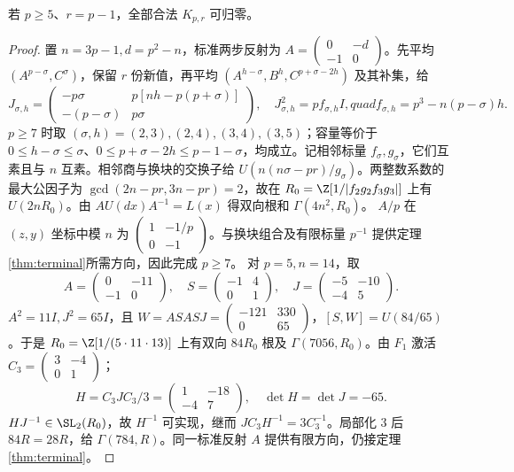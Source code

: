 \begin{lemma}\label{lem:upper-boundary}
若 $p\ge5$、$r=p-1$，全部合法 $K_{p,r}$ 可归零。
\end{lemma}
\begin{proof}
置 $n=3p-1,d=p^2-n$，标准两步反射为 $A=\left(\begin{smallmatrix}0&-d\\-1&0\end{smallmatrix}\right)$。先平均 $(A^{p-\sigma},C^\sigma)$，保留 $r$ 份新值，再平均 $(A^{h-\sigma},B^h,C^{p+\sigma-2h})$ 及其补集，给
\[
J_{\sigma,h}=\begin{pmatrix}-p\sigma&p[nh-p(p+\sigma)]\\-(p-\sigma)&p\sigma\end{pmatrix},
\quad J_{\sigma,h}^2=pf_{\sigma,h}I,quad f_{\sigma,h}=p^3-n(p-\sigma)h.
\]
$p\ge7$ 时取 $(\sigma,h)=(2,3),(2,4),(3,4),(3,5)$；容量等价于 $0\le h-\sigma\le\sigma$、$0\le p+\sigma-2h\le p-1-\sigma$，均成立。记相邻标量 $f_\sigma,g_\sigma$，它们互素且与 $n$ 互素。相邻商与换块的交换子给 $U(n(n\sigma-pr)/g_\sigma)$。两整数系数的最大公因子为 $\gcd(2n-pr,3n-pr)=2$，故在 $R_0=\Z[1/|f_2g_2f_3g_3|]$ 上有 $U(2nR_0)$。由 $AU(dx)A^{-1}=L(x)$ 得双向根和 $\Gamma(4n^2,R_0)$。
$A/p$ 在 $(z,y)$ 坐标中模 $n$ 为 $\left(\begin{smallmatrix}1&-1/p\\0&-1\end{smallmatrix}\right)$。与换块组合及有限标量 $p^{-1}$ 提供定理\ref{thm:terminal}所需方向，因此完成 $p\ge7$。
对 $p=5,n=14$，取
\[
A=\begin{pmatrix}0&-11\\-1&0\end{pmatrix},\quad
S=\begin{pmatrix}-1&4\\0&1\end{pmatrix},\quad
J=\begin{pmatrix}-5&-10\\-4&5\end{pmatrix}.
\]
$A^2=11I,J^2=65I$，且 $W=ASASJ=\left(\begin{smallmatrix}-121&330\\0&65\end{smallmatrix}\right)$，$[S,W]=U(84/65)$。于是 $R_0=\Z[1/(5\cdot11\cdot13)]$ 上有双向 $84R_0$ 根及 $\Gamma(7056,R_0)$。由 $F_1$ 激活 $C_3=\left(\begin{smallmatrix}3&-4\\0&1\end{smallmatrix}\right)$；
\[
H=C_3JC_3/3=\begin{pmatrix}1&-18\\-4&7\end{pmatrix},\quad
\det H=\det J=-65.
\]
$HJ^{-1}\in\SL_2(R_0)$，故 $H^{-1}$ 可实现，继而 $JC_3H^{-1}=3C_3^{-1}$。局部化 $3$ 后 $84R=28R$，给 $\Gamma(784,R)$。同一标准反射 $A$ 提供有限方向，仍接定理\ref{thm:terminal}。
\end{proof}

